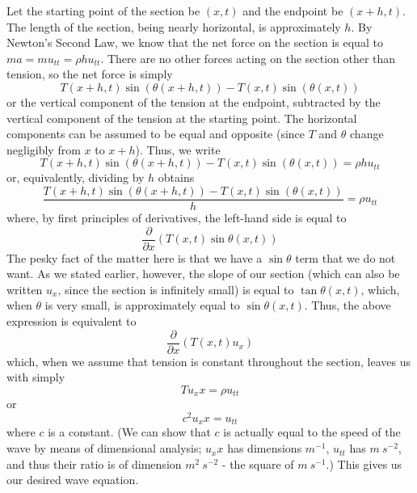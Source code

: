 \documentclass{article}
\begin{document}
Let the starting point of the section be $(x,t)$ and the endpoint be $(x+h,t)$. The length of the section, being nearly horizontal, is approximately $h$. By Newton's Second Law, we know that the net force on the section is equal to $ma = mu_{tt}=\rho h u_{tt}$. There are no other forces acting on the section other than tension, so the net force is simply 
\begin{equation*}
    T(x+h,t)\sin(\theta(x+h,t))-T(x,t)\sin(\theta(x,t))
\end{equation*}
or the vertical component of the tension at the endpoint, subtracted by the vertical component of the tension at the starting point. The horizontal components can be assumed to be equal and opposite (since $T$ and $\theta$ change negligibly from $x$ to $x+h$). Thus, we write 
\begin{equation*}
    T(x+h,t)\sin(\theta(x+h,t))-T(x,t)\sin(\theta(x,t)) = \rho h u_{tt}
\end{equation*}
or, equivalently, dividing by $h$ obtains 
\begin{equation*}
    \frac{T(x+h,t)\sin(\theta(x+h,t))-T(x,t)\sin(\theta(x,t))}{h} = \rho u_{tt}
\end{equation*}
where, by first principles of derivatives, the left-hand side is equal to 
\begin{equation*}
    \frac{\partial}{\partial x}(T(x,t)\sin\theta(x,t))
\end{equation*}
The pesky fact of the matter here is that we have a $\sin \theta$ term that we do not want. As we stated earlier, however, the slope of our section (which can also be written $u_x$, since the section is infinitely small) is equal to $\tan \theta(x,t)$, which, when $\theta$ is very small, is approximately equal to $\sin \theta(x,t)$. Thus, the above expression is equivalent to 
\begin{equation*}
    \frac{\partial}{\partial x}(T(x,t)u_x)
\end{equation*}
which, when we assume that tension is constant throughout the section, leaves us with simply
\begin{equation*}
    Tu_xx=\rho u_{tt}
\end{equation*}
or 
\begin{equation*}
    c^2 u_xx= u_{tt}
\end{equation*}
where $c$ is a constant. (We can show that $c$ is actually equal to the speed of the wave by means of dimensional analysis; $u_xx$ has dimensions $m^{-1}$, $u_{tt}$ has $m\ s^{-2}$, and thus their ratio is of dimension $m^2\ s^{-2}$ - the square of $m\ s^{-1}$.) This gives us our desired wave equation. \\ \\
\end{document}
